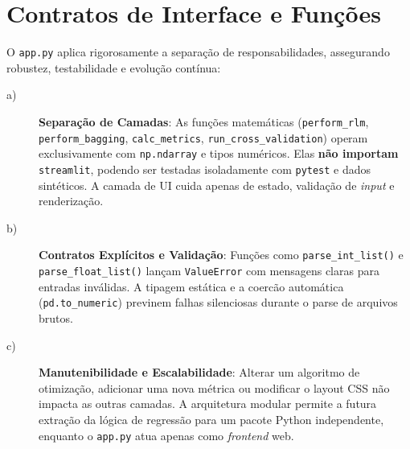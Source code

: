\section{Contratos de Interface e Funções}
O \verb|app.py| aplica rigorosamente a separação de responsabilidades, assegurando robustez, testabilidade e evolução contínua:
\begin{description}
\item[a)] \textbf{Separação de Camadas}: As funções matemáticas (\verb|perform_rlm|, \verb|perform_bagging|, \verb|calc_metrics|, \verb|run_cross_validation|) operam exclusivamente com \verb|np.ndarray| e tipos numéricos. Elas \textbf{não importam} \verb|streamlit|, podendo ser testadas isoladamente com \texttt{pytest} e dados sintéticos. A camada de UI cuida apenas de estado, validação de \textit{input} e renderização.
\item[b)] \textbf{Contratos Explícitos e Validação}: Funções como \verb|parse_int_list()| e \verb|parse_float_list()| lançam \verb|ValueError| com mensagens claras para entradas inválidas. A tipagem estática e a coercão automática (\verb|pd.to_numeric|) previnem falhas silenciosas durante o parse de arquivos brutos.
\item[c)] \textbf{Manutenibilidade e Escalabilidade}: Alterar um algoritmo de otimização, adicionar uma nova métrica ou modificar o layout CSS não impacta as outras camadas. A arquitetura modular permite a futura extração da lógica de regressão para um pacote Python independente, enquanto o \verb|app.py| atua apenas como \textit{frontend} web.
\end{description}